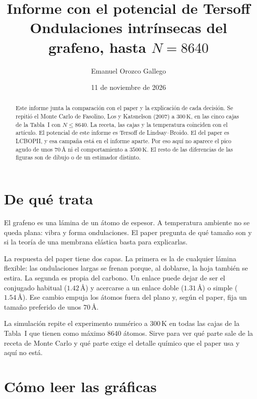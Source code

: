 \documentclass[11pt,a4paper]{article}
\title{Informe con el potencial de Tersoff\\[0.35em]
\large Ondulaciones intrínsecas del grafeno, hasta $N=8640$}
\author{Emanuel Orozco Gallego}
\date{11 de noviembre de 2026}
\begin{document}
\maketitle

\begin{abstract}
Este informe junta la comparación con el paper y la explicación de cada decisión.
Se repitió el Monte Carlo de Fasolino, Los y Katsnelson (2007) a $300\,\mathrm{K}$,
en las cinco cajas de la Tabla~I con $N\le 8640$.
La receta, las cajas y la temperatura coinciden con el artículo.
El potencial de este informe es Tersoff de Lindsay--Broido.
El del paper es LCBOPII, y esa campaña está en el informe aparte.
Por eso aquí no aparece el pico agudo de unos $70\,\text{\AA}$ ni el comportamiento a $3500\,\mathrm{K}$.
El resto de las diferencias de las figuras son de dibujo o de un estimador distinto.
\end{abstract}

\tableofcontents

\section{De qué trata}

El grafeno es una lámina de un átomo de espesor.
A temperatura ambiente no se queda plana: vibra y forma ondulaciones.
El paper pregunta de qué tamaño son y si la teoría de una membrana elástica basta para explicarlas.

La respuesta del paper tiene dos capas.
La primera es la de cualquier lámina flexible: las ondulaciones largas se frenan porque, al doblarse, la hoja también se estira.
La segunda es propia del carbono.
Un enlace puede dejar de ser el conjugado habitual ($1.42\,\text{\AA}$) y acercarse a un enlace doble ($1.31\,\text{\AA}$) o simple ($1.54\,\text{\AA}$).
Ese cambio empuja los átomos fuera del plano y, según el paper, fija un tamaño preferido de unos $70\,\text{\AA}$.

La simulación repite el experimento numérico a $300\,\mathrm{K}$ en todas las cajas de la Tabla~I que tienen como máximo 8640 átomos.
Sirve para ver qué parte sale de la receta de Monte Carlo y qué parte exige el detalle químico que el paper usa y aquí no está.

\section{Cómo leer las gráficas}
\end{document}
